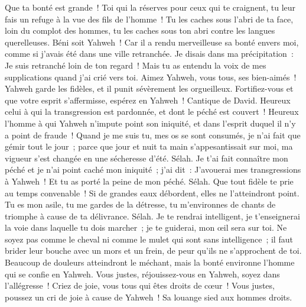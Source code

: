 \begin{multicols}{2}
Que ta bonté est grande~! Toi qui la réserves pour ceux qui te craignent, tu leur fais un refuge à la vue des fils de l'homme~!
Tu les caches sous l'abri de ta face, loin du complot des hommes, tu les caches sous ton abri contre les langues querelleuses.
Béni soit Yahweh~! Car il a rendu merveilleuse sa bonté envers moi, comme si j'avais été dans une ville retranchée.
Je disais dans ma précipitation~: Je suis retranché loin de ton regard~! Mais tu as entendu la voix de mes supplications quand j'ai crié vers toi.
Aimez Yahweh, vous tous, ses bien-aimés~! Yahweh garde les fidèles, et il punit sévèrement les orgueilleux.
Fortifiez-vous et que votre esprit s'affermisse, espérez en Yahweh~!
\VerseOne{}Cantique de David. Heureux celui à qui la transgression est pardonnée, et dont le péché est couvert~!
Heureux l'homme à qui Yahweh n'impute point son iniquité, et dans l'esprit duquel il n'y a point de fraude~!
Quand je me suis tu, mes os se sont consumés, je n'ai fait que gémir tout le jour~;
parce que jour et nuit ta main s'appesantissait sur moi, ma vigueur s'est changée en une sécheresse d'été. Sélah.
Je t'ai fait connaître mon péché et je n'ai point caché mon iniquité~; j'ai dit~: J'avouerai mes transgressions à Yahweh~! Et tu as porté la peine de mon péché. Sélah.
Que tout fidèle te prie au temps convenable~! Si de grandes eaux débordent, elles ne l'atteindront point.
Tu es mon asile, tu me gardes de la détresse, tu m'environnes de chants de triomphe à cause de ta délivrance. Sélah.
Je te rendrai intelligent, je t'enseignerai la voie dans laquelle tu dois marcher~; je te guiderai, mon œil sera sur toi.
Ne soyez pas comme le cheval ni comme le mulet qui sont sans intelligence~; il faut brider leur bouche avec un mors et un frein, de peur qu'ils ne s'approchent de toi.
Beaucoup de douleurs atteindront le méchant, mais la bonté environne l'homme qui se confie en Yahweh.
Vous justes, réjouissez-vous en Yahweh, soyez dans l'allégresse~! Criez de joie, vous tous qui êtes droits de cœur~!
\VerseOne{}Vous justes, poussez un cri de joie à cause de Yahweh~! Sa louange sied aux hommes droits.

\end{multicols}
